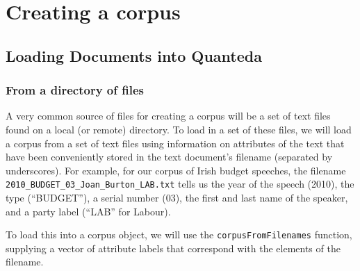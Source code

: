 \documentclass[11pt]{article}
\begin{document}
\section{Creating a corpus}

\subsection{Loading Documents into Quanteda}

\subsubsection{From a directory of files}

A very common source of files for creating a corpus will be a set of
text files found on a local (or remote) directory.  To load in a set
of these files, we will load a corpus from a set of text files using
information on attributes of the text that have been conveniently
stored in the text document's filename (separated by underscores).
For example, for our corpus of Irish budget speeches, the filename
\texttt{2010\_BUDGET\_03\_Joan\_Burton\_LAB.txt} tells us the year of
the speech (2010), the type (``BUDGET''), a serial number (03), the
first and last name of the speaker, and a party label (``LAB'' for
Labour).

To load this into a corpus object, we will use the
\texttt{corpusFromFilenames} function, supplying a vector of attribute
labels that correspond with the elements of the filename.

\begin{knitrout}
\color{fgcolor}\begin{kframe}
\begin{alltt}
 \hlkwb{<-} 
   \hlstd{=} \hlstd{)}  
 \hlkwb{<-} \hlstd{(}\hlstd{,} \hlstd{,} \hlstd{,} \hlstd{,} \hlstd{,} \hlstd{)}
\end{alltt}
\end{kframe}
\end{knitrout}
\end{document}
